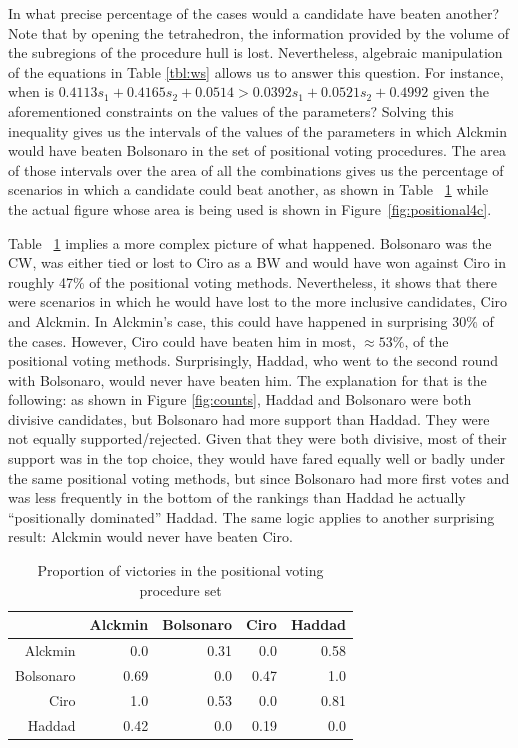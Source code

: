 \documentclass[hidelinks,11pt]{article} \usepackage[utf8]{inputenc}
\begin{document}
In what precise percentage of the cases would a candidate have beaten another?
Note that by opening the tetrahedron, the information provided by the volume of
the subregions of the procedure hull is lost. Nevertheless, algebraic
manipulation of the equations in Table \ref{tbl:ws} allows us to answer this
question. For instance, when is \( 0.4113 s_{1} + 0.4165 s_2 + 0.0514 >
0.0392 s_{1} + 0.0521 s_2 + 0.4992 \) given the aforementioned constraints
on the values of the parameters? Solving this inequality gives us the intervals
of the values of the parameters in which Alckmin would have beaten Bolsonaro in
the set of positional voting procedures. The area of those intervals over the
area of all the combinations gives us the percentage of scenarios in which a
candidate could beat another, as shown in Table ~\ref{tbl:ctn} while the actual
figure whose area is being used is shown in Figure~\ref{fig:positional4c}.

Table ~\ref{tbl:ctn} implies a more complex picture of what happened. Bolsonaro
was the CW, was either tied or lost to Ciro as a BW and would have won against Ciro in
roughly 47\(\%\) of the positional voting methods. Nevertheless, it shows that
there were scenarios in which he would have lost to the more inclusive
candidates, Ciro and Alckmin. In Alckmin's case, this could have happened in
surprising \(30\%\) of the cases. However, Ciro could have beaten him in most,
\(\approx 53\%\), of the positional voting methods. Surprisingly, Haddad, who
went to the second round with Bolsonaro, would never have beaten him. The
explanation for that is the following: as shown in Figure \ref{fig:counts},
Haddad and Bolsonaro were both divisive candidates, but Bolsonaro had more
support than Haddad. They were not equally supported/rejected. Given that they
were both divisive, most of their support was in the top choice, they would have
fared equally well or badly under the same positional voting methods, but since
Bolsonaro had more first votes and was less frequently in the bottom of the
rankings than Haddad he actually ``positionally dominated'' Haddad. The same
logic applies to another surprising result: Alckmin would never have beaten
Ciro.


\begin{table}[!h]
  \centering
  \begin{tabular}{rrrrr}
    \hline
     & Alckmin & Bolsonaro & Ciro & Haddad \\
    \hline
    Alckmin & 0.0 & 0.31 & 0.0 & 0.58 \\
    Bolsonaro & 0.69 & 0.0 & 0.47 & 1.0 \\
    Ciro & 1.0 & 0.53 & 0.0 & 0.81 \\
    Haddad & 0.42 & 0.0 & 0.19 & 0.0 \\\hline\hline
  \end{tabular}
   \caption{Proportion of victories in the positional voting procedure set}
\label{tbl:ctn}
\end{table}
\end{document}
